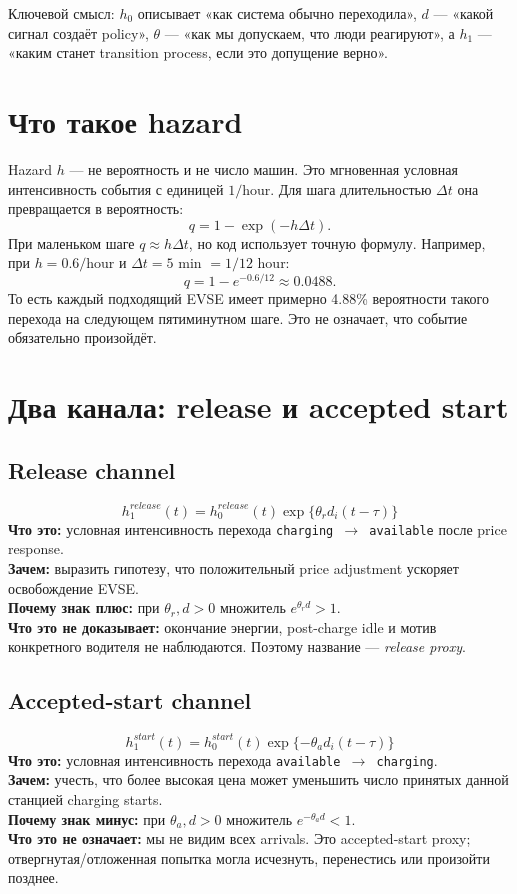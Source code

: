 \documentclass[11pt,a4paper]{article}
\newcommand{\code}[1]{\texttt{#1}}
\begin{document}
Ключевой смысл: $h_0$ описывает «как система обычно переходила», $d$ --- «какой сигнал создаёт policy», $\theta$ --- «как мы допускаем, что люди реагируют», а $h_1$ --- «каким станет transition process, если это допущение верно».

\section{Что такое hazard}
Hazard $h$ --- не вероятность и не число машин. Это мгновенная условная интенсивность события с единицей $1/\text{hour}$. Для шага длительностью $\Delta t$ она превращается в вероятность:
\[
q=1-\exp(-h\Delta t).
\]
При маленьком шаге $q\approx h\Delta t$, но код использует точную формулу. Например, при $h=0.6/\text{hour}$ и $\Delta t=5$ min $=1/12$ hour:
\[
q=1-e^{-0.6/12}\approx0.0488.
\]
То есть каждый подходящий EVSE имеет примерно 4.88\% вероятности такого перехода на следующем пятиминутном шаге. Это не означает, что событие обязательно произойдёт.

\section{Два канала: release и accepted start}
\subsection{Release channel}
\[
\boxed{h_1^{release}(t)=h_0^{release}(t)\exp\{\theta_r d_i(t-\tau)\}}
\]
\textbf{Что это:} условная интенсивность перехода \code{charging $\to$ available} после price response.\\
\textbf{Зачем:} выразить гипотезу, что положительный price adjustment ускоряет освобождение EVSE.\\
\textbf{Почему знак плюс:} при $\theta_r,d>0$ множитель $e^{\theta_r d}>1$.\\
\textbf{Что это не доказывает:} окончание энергии, post-charge idle и мотив конкретного водителя не наблюдаются. Поэтому название --- \emph{release proxy}.

\subsection{Accepted-start channel}
\[
\boxed{h_1^{start}(t)=h_0^{start}(t)\exp\{-\theta_a d_i(t-\tau)\}}
\]
\textbf{Что это:} условная интенсивность перехода \code{available $\to$ charging}.\\
\textbf{Зачем:} учесть, что более высокая цена может уменьшить число принятых данной станцией charging starts.\\
\textbf{Почему знак минус:} при $\theta_a,d>0$ множитель $e^{-\theta_a d}<1$.\\
\textbf{Что это не означает:} мы не видим всех arrivals. Это accepted-start proxy; отвергнутая/отложенная попытка могла исчезнуть, перенестись или произойти позднее.
\end{document}
